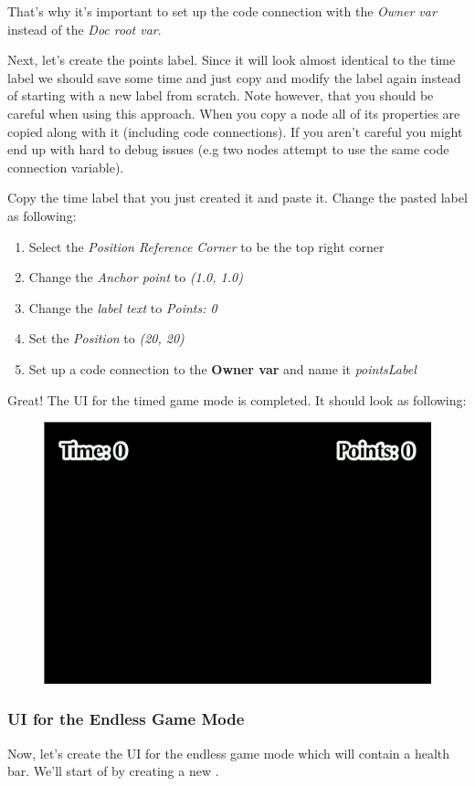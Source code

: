 That's why it's important to set up the code connection with the \textit{Owner var} instead of the \textit{Doc root var}.

Next, let's create the points label. Since it will look almost identical to the
time label we should save some time and just copy and modify the label again
instead of starting with a new label from scratch. Note however, that you should
be careful when using this approach. When you copy a node all of its
properties are copied along with it (including code connections). If you aren't
careful you might end up with hard to debug issues (e.g two nodes attempt to use
the same code connection variable).

\begin{leftbar}
Copy the time label that you just created it and paste it. Change the pasted
label as following:
\begin{enumerate}
  \item Select the \textit{Position Reference Corner} to be the top right corner
  \item Change the \textit{Anchor point} to \textit{(1.0, 1.0)}
  \item Change the \textit{label text} to \textit{Points: 0}
  \item Set the \textit{Position} to \textit{(20, 20)}
  \item Set up a code connection to the \textbf{Owner var} and name it \textit{pointsLabel}
\end{enumerate}
\end{leftbar}

Great! The UI for the timed game mode is completed. It should look as following:

\begin{figure}[H]
    \centering
    \includegraphics[width=0.5\linewidth]{images/Chapter7/timed_mode_ui.png}
\end{figure}

\subsubsection{UI for the Endless Game Mode}
Now, let's create the  UI for the endless game mode which will contain a health
bar. We'll start of by creating a new \ccbfile{}.

